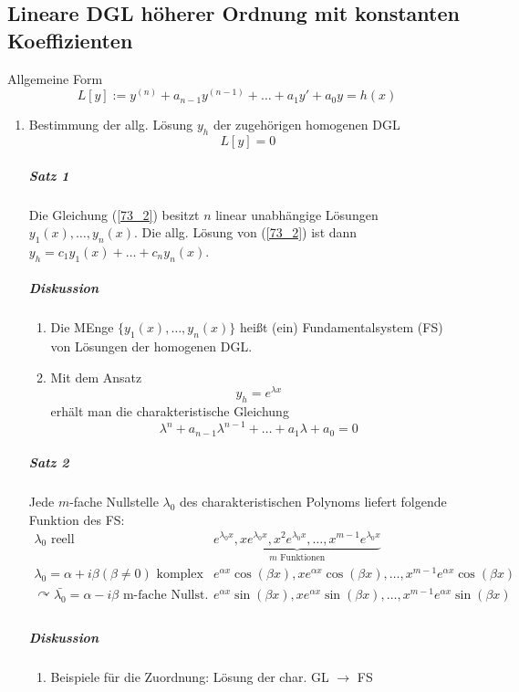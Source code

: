 \documentclass[a4paper]{scrartcl}
\begin{document}
\subsection{Lineare DGL höherer Ordnung mit konstanten Koeffizienten}
Allgemeine Form 
\begin{equation}\label{73_1} L[y] := y^{(n)} + a_{n-1} y^{(n-1)} + \dots + a_1 y' + a_0 y = h(x)
\end{equation}
\begin{enumerate}
\item Bestimmung der allg. Lösung $y_h$ der zugehörigen homogenen DGL \begin{equation}\label{73_2} L[y] = 0 \end{equation}

\subparagraph{Satz 1} Die Gleichung (\ref{73_2}) besitzt $n$ linear unabhängige Lösungen $y_1(x),\dots,y_n(x)$. Die allg. Lösung von (\ref{73_2}) ist dann $y_h = c_1 y_1(x) + \dots + c_n y_n(x)$.
\subparagraph{Diskussion}
\begin{enumerate}
\item Die MEnge $\{ y_1(x) , \dots , y_n(x)\}$ heißt (ein) Fundamentalsystem (FS) von Lösungen der homogenen DGL.
\item Mit dem Ansatz \[ y_h = e^{\lambda x} \] erhält man die charakteristische Gleichung \begin{equation}\label{73_3} \lambda^n + a_{n-1} \lambda^{n-1} + \dots + a_1 \lambda + a_0 = 0 \end{equation}
\end{enumerate}

\subparagraph{Satz 2} Jede $m$-fache Nullstelle $\lambda_0$ des charakteristischen Polynoms liefert folgende Funktion des FS:
\[ \begin{array}{l|l}
\lambda_0 \text{ reell} & \underbrace{e^{\lambda_0 x}, x e^{\lambda_0 x}, x^2 e^{\lambda_0 x}, \dots, x^{m-1} e^{\lambda_0 x}}_{m \text{ Funktionen}}\\ \hline
\lambda_0 = \alpha + i \beta (\beta \neq 0) \text{ komplex} & e^{\alpha x} \cos{(\beta x)}, xe^{\alpha x} \cos{(\beta x)}, \dots , x^{m-1} e^{\alpha x} \cos{(\beta x)} \\
\curvearrowright \bar{\lambda_0} = \alpha - i \beta \text { m-fache Nullst.} & e^{\alpha x} \sin{(\beta x)} , x e^{\alpha x} \sin{(\beta x)}, \dots, x^{m-1} e^{\alpha x} \sin{(\beta x)} \\
\end{array}\]

\subparagraph{Diskussion} 
\begin{enumerate}
\item Beispiele für die Zuordnung: Lösung der char. GL $\rightarrow$ FS


\end{enumerate}
\end{enumerate}
\end{document}
